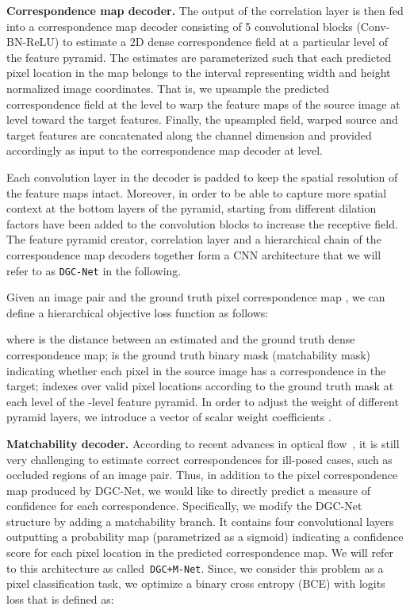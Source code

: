 \documentclass[10pt,twocolumn,letterpaper]{article}
\begin{document}
\noindent\textbf{Correspondence map decoder.} 
The output of the correlation layer is then fed into a correspondence map decoder consisting of 5 convolutional blocks (Conv-BN-ReLU) to estimate a 2D dense correspondence field  at a particular level  of the feature pyramid. The estimates are parameterized such that each predicted pixel location in the map belongs to the interval  representing width and height normalized image coordinates. That is, we upsample the predicted correspondence field at the  level to warp the feature maps of the source image at  level toward the target features. Finally, the upsampled field, warped source  and target  features are concatenated along the channel dimension and provided accordingly as input to the correspondence map decoder at  level. 

Each convolution layer in the decoder is padded to keep the spatial resolution of the feature maps intact. Moreover, in order to be able to capture more spatial context at the bottom layers of the pyramid, starting from  different dilation factors have been added to the convolution blocks to increase the receptive field. The feature pyramid creator, correlation layer and a hierarchical chain of the correspondence map decoders together form a CNN architecture that we will refer to as \texttt{DGC-Net} in the following.

Given an image pair and the ground truth pixel correspondence map , we can define a hierarchical objective loss function as follows: 

\noindent where  is the  distance between an estimated  and the ground truth  dense correspondence map;  is the ground truth binary mask (matchability mask) indicating whether each pixel in the source image has a correspondence in the target;  indexes over valid pixel locations  according to the ground truth mask at each level  of the -level feature pyramid. In order to adjust the weight of different pyramid layers, we introduce a vector of scalar weight coefficients . 

\noindent\textbf{Matchability decoder.}
According to recent advances in optical flow~\cite{Janai2018ECCV,PWC-Net}, it is still very challenging to estimate correct correspondences for ill-posed cases, such as occluded regions of an image pair. Thus, in addition to the pixel correspondence map produced by DGC-Net, we would like to directly predict a measure of confidence for each correspondence. Specifically, we  modify the DGC-Net structure by adding a matchability branch. It contains four convolutional layers outputting a probability map (parametrized as a sigmoid) indicating a confidence score for each pixel location in the predicted correspondence map. We will refer to this architecture as called~\texttt{DGC+M-Net}. Since, we consider this problem as a pixel classification task, we optimize a binary cross entropy (BCE) with logits loss that is defined as:
\end{document}
